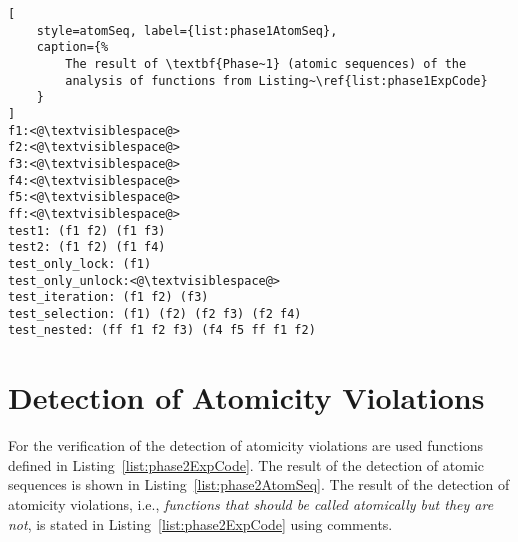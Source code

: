 \begin{lstlisting}[
    style=atomSeq, label={list:phase1AtomSeq},
    caption={%
        The result of \textbf{Phase~1} (atomic sequences) of the
        analysis of functions from Listing~\ref{list:phase1ExpCode}
    }
]
f1:<@\textvisiblespace@>
f2:<@\textvisiblespace@>
f3:<@\textvisiblespace@>
f4:<@\textvisiblespace@>
f5:<@\textvisiblespace@>
ff:<@\textvisiblespace@>
test1: (f1 f2) (f1 f3)
test2: (f1 f2) (f1 f4)
test_only_lock: (f1)
test_only_unlock:<@\textvisiblespace@>
test_iteration: (f1 f2) (f3)
test_selection: (f1) (f2) (f2 f3) (f2 f4)
test_nested: (ff f1 f2 f3) (f4 f5 ff f1 f2)
\end{lstlisting}


\section{Detection of Atomicity Violations}
\label{sec:expResPhase2}

For the verification of the detection of atomicity violations are used
functions defined in Listing~\ref{list:phase2ExpCode}. The result of
the detection of atomic sequences is shown in
Listing~\ref{list:phase2AtomSeq}. The result of the detection of atomicity
violations, i.e., \emph{functions that should be called atomically but they
are not}, is stated in Listing~\ref{list:phase2ExpCode} using
\textcolor{greencomments}{comments}.


